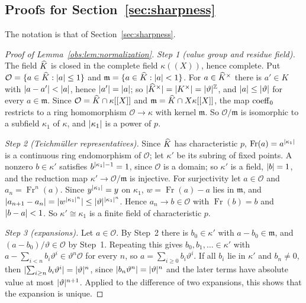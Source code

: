 \subsection{Proofs for Section~\ref{sec:sharpness}}\label{dfr:ssec:sharpness}

The notation is that of Section~\ref{sec:sharpness}.

\begin{proof}[Proof of Lemma~\ref{obs:lem:normalization}]
\emph{Step 1 (value group and residue field).} The field $\widehat K$ is closed in the complete field $\kappa((X))$, hence
complete. Put $\mathcal O=\{a\in\widehat K:\lvert a\rvert\le1\}$ and $\mathfrak m=\{a\in\widehat K:\lvert a\rvert<1\}$. For $a\in\widehat K^\times$ there is
$a'\in K$ with $\lvert a-a'\rvert<\lvert a\rvert$, hence $\lvert a'\rvert=\lvert a\rvert$; so $\lvert \widehat K^\times\rvert=\lvert K^\times\rvert=\lvert \vartheta\rvert^\mathbb Z$, and
$\lvert a\rvert\le\lvert \vartheta\rvert$ for every $a\in\mathfrak m$. Since $\mathcal O=\widehat K\cap\kappa[[X]]$ and
$\mathfrak m=\widehat K\cap X\kappa[[X]]$, the map $\operatorname{coeff}_0$ restricts to a ring homomorphism $\mathcal O\to\kappa$ with kernel
$\mathfrak m$. So $\mathcal O/\mathfrak m$ is isomorphic to a subfield $\kappa_1$ of $\kappa$, and $\lvert \kappa_1\rvert$ is a
power of $p$.

\emph{Step 2 (Teichm\"uller representatives).} Since $\widehat K$ has characteristic $p$,
$\operatorname{Fr}(a)=a^{\lvert \kappa_1\rvert}$ is a continuous ring endomorphism of $\mathcal O$; let $\kappa'$ be its subring
of fixed points. A nonzero $b\in\kappa'$ satisfies $b^{\lvert \kappa_1\rvert-1}=1$, since $\mathcal O$ is a domain; so $\kappa'$
is a field, $\lvert b\rvert=1$, and the reduction map $\kappa'\to\mathcal O/\mathfrak m$ is injective. For surjectivity let
$a\in\mathcal O$ and $a_n=\operatorname{Fr}^n(a)$. Since $y^{\lvert \kappa_1\rvert}=y$ on $\kappa_1$, $w=\operatorname{Fr}(a)-a$
lies in $\mathfrak m$, and $\lvert a_{n+1}-a_n\rvert=\lvert w^{\lvert \kappa_1\rvert^n}\rvert\le\lvert \vartheta\rvert^{\lvert \kappa_1\rvert^n}$. Hence
$a_n\to b\in\mathcal O$ with $\operatorname{Fr}(b)=b$ and $\lvert b-a\rvert<1$. So $\kappa'\cong\kappa_1$ is a finite field of
characteristic $p$.

\emph{Step 3 (expansions).} Let $a\in\mathcal O$. By Step~2 there is $b_0\in\kappa'$ with $a-b_0\in\mathfrak m$, and
$(a-b_0)/\vartheta\in\mathcal O$ by Step~1. Repeating this gives $b_0,b_1,\ldots\in\kappa'$ with
$a-\sum_{i<n}b_i\vartheta^i\in\vartheta^n\mathcal O$ for every $n$, so $a=\sum_{i\ge0}b_i\vartheta^i$. If all $b_i$ lie
in $\kappa'$ and $b_n\ne0$, then $\lvert \sum_{i\ge n}b_i\vartheta^i\rvert=\lvert \vartheta\rvert^n$, since $\lvert b_n\vartheta^n\rvert=
\lvert \vartheta\rvert^n$ and the later terms have absolute value at most $\lvert \vartheta\rvert^{n+1}$. Applied to the difference of two
expansions, this shows that the expansion is unique.


\end{proof}
